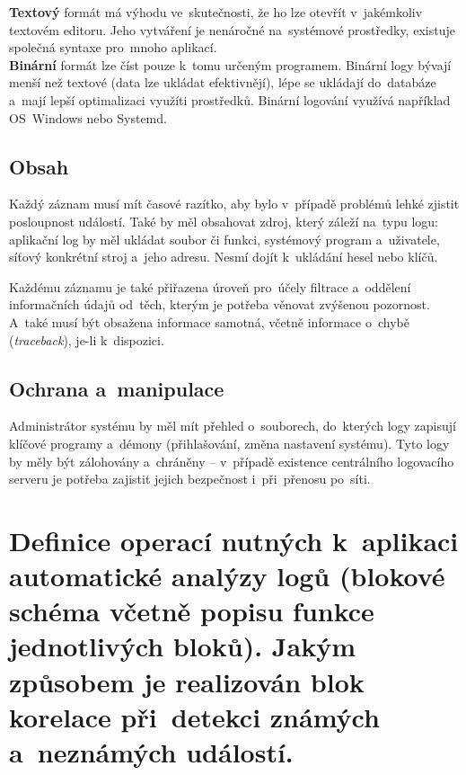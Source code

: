 \textbf{Textový} formát má výhodu ve~skutečnosti, že ho lze otevřít v~jakémkoliv textovém editoru. Jeho vytváření je nenáročné na~systémové prostředky, existuje společná syntaxe pro~mnoho aplikací. \\
\textbf{Binární} formát lze číst pouze k~tomu určeným programem. Binární logy bývají menší než textové (data lze ukládat efektivnějí), lépe se ukládají do~databáze a~mají lepší optimalizaci využíti prostředků. Binární logování využívá například OS~Windows nebo Systemd.

\subsection{Obsah}

Každý záznam musí mít časové razítko, aby bylo v~případě problémů lehké zjistit posloupnost událostí. Také by měl obsahovat zdroj, který záleží na~typu logu: aplikační log by měl ukládat soubor či funkci, systémový program a~uživatele, síťový konkrétní stroj a~jeho adresu. Nesmí dojít k~ukládání hesel nebo klíčů.

Každému záznamu je také přiřazena úroveň pro~účely filtrace a~oddělení informačních údajů od~těch, kterým je potřeba věnovat zvýšenou pozornost. A~také musí být obsažena informace samotná, včetně informace o~chybě (\emph{traceback}), je-li k~dispozici.

\subsection{Ochrana a~manipulace}

Administrátor systému by měl mít přehled o~souborech, do~kterých logy zapisují klíčové programy a~démony (přihlašování, změna nastavení systému). Tyto logy by měly být zálohovány a~chráněny -- v~případě existence centrálního logovacího serveru je potřeba zajistit jejich bezpečnost i~při~přenosu po~síti.

\clearpage
\section{Definice operací nutných k~aplikaci automatické analýzy logů (blokové schéma včetně popisu funkce jednotlivých bloků). Jakým způsobem je realizován blok korelace při~detekci známých a~neznámých událostí.}

